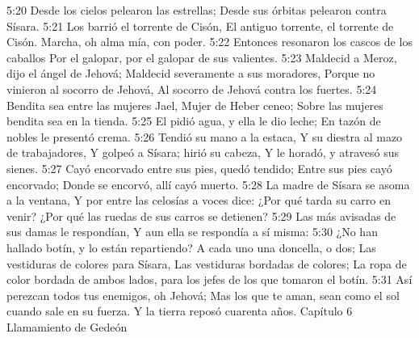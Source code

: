 5:20 Desde los cielos pelearon las estrellas;  
Desde sus órbitas pelearon contra Sísara.  
5:21 Los barrió el torrente de Cisón,  
El antiguo torrente, el torrente de Cisón.  
Marcha, oh alma mía, con poder.  
5:22 Entonces resonaron los cascos de los caballos  
Por el galopar, por el galopar de sus valientes.  
5:23 Maldecid a Meroz, dijo el ángel de Jehová;  
Maldecid severamente a sus moradores,  
Porque no vinieron al socorro de Jehová,  
Al socorro de Jehová contra los fuertes.  
5:24 Bendita sea entre las mujeres Jael,  
Mujer de Heber ceneo;  
Sobre las mujeres bendita sea en la tienda.  
5:25 El pidió agua, y ella le dio leche; 
En tazón de nobles le presentó crema.  
5:26 Tendió su mano a la estaca,  
Y su diestra al mazo de trabajadores,  
Y golpeó a Sísara; hirió su cabeza,  
Y le horadó, y atravesó sus sienes. 
5:27 Cayó encorvado entre sus pies, quedó tendido;  
Entre sus pies cayó encorvado;  
Donde se encorvó, allí cayó muerto.  
5:28 La madre de Sísara se asoma a la ventana,  
Y por entre las celosías a voces dice:  
¿Por qué tarda su carro en venir?  
¿Por qué las ruedas de sus carros se detienen?  
5:29 Las más avisadas de sus damas le respondían,  
Y aun ella se respondía a sí misma:  
5:30 ¿No han hallado botín, y lo están repartiendo?  
A cada uno una doncella, o dos;  
Las vestiduras de colores para Sísara,  
Las vestiduras bordadas de colores;  
La ropa de color bordada de ambos lados, para los jefes de los que tomaron el botín.  
5:31 Así perezcan todos tus enemigos, oh Jehová;  
Mas los que te aman, sean como el sol cuando sale en su fuerza.  
Y la tierra reposó cuarenta años.  
Capítulo 6
Llamamiento de Gedeón  

